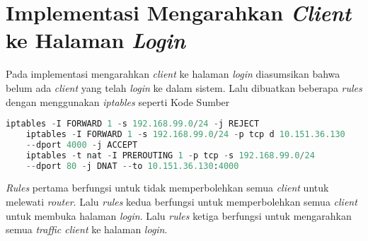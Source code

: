   \section{Implementasi Mengarahkan \textit{Client} ke Halaman \textit{Login}}
  Pada implementasi mengarahkan \textit{client} ke halaman \textit{login} diasumsikan bahwa belum ada \textit{client} yang telah \textit{login} ke dalam sistem. Lalu dibuatkan beberapa \textit{rules} dengan menggunakan \textit{iptables} seperti Kode Sumber \\
  \begin{minipage}{\linewidth}
  	\begin{lstlisting}[caption=Command untuk mengarahkan \textit{client} ke halaman \textit{login},language=Python,label=installcollectd]
  	iptables -I FORWARD 1 -s 192.168.99.0/24 -j REJECT
  	iptables -I FORWARD 1 -s 192.168.99.0/24 -p tcp d 10.151.36.130
  	--dport 4000 -j ACCEPT
  	iptables -t nat -I PREROUTING 1 -p tcp -s 192.168.99.0/24
  	--dport 80 -j DNAT --to 10.151.36.130:4000
  	\end{lstlisting}
  \end{minipage}
  
  \textit{Rules} pertama berfungsi untuk tidak memperbolehkan semua \textit{client} untuk melewati \textit{router}. Lalu \textit{rules} kedua berfungsi untuk memperbolehkan semua \textit{client} untuk membuka halaman \textit{login}. Lalu \textit{rules} ketiga berfungsi untuk mengarahkan semua \textit{traffic client} ke halaman \textit{login}.
  
